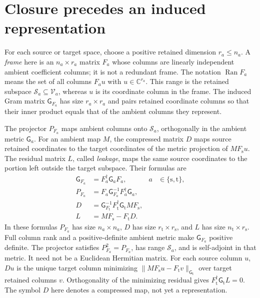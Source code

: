\section{Closure precedes an induced representation}

\begin{definition}
\label{def:symmetry-retained-frame}
For each source or target space, choose a positive retained dimension
$r_a\leq n_a$. A \emph{frame} here is an $n_a\times r_a$ matrix $F_a$ whose
columns are linearly independent ambient coefficient columns; it is not a
redundant frame. The notation $\operatorname{Ran}F_a$ means the set of all
columns $F_a u$ with $u\in\mathbb C^{r_a}$. This range is the retained
subspace $\mathcal S_a\subseteq\mathcal V_a$, whereas $u$ is its coordinate
column in the frame. The induced Gram matrix $\mathsf G_{F_a}$ has size
$r_a\times r_a$ and pairs retained coordinate columns so that their inner
product equals that of the ambient columns they represent.
\end{definition}

\begin{definition}
\label{def:symmetry-compression-leakage}
The projector $P_{F_a}$ maps ambient columns onto $\mathcal S_a$, orthogonally
in the ambient metric $\mathsf G_a$. For an ambient map $M$, the compressed
matrix $D$ maps source retained coordinates to the target coordinates of the
metric projection of $MF_{\mathrm s}u$. The residual matrix $L$, called
\emph{leakage}, maps the same source coordinates to the portion left outside
the target subspace. Their formulas are
\begin{align}
  \mathsf G_{F_a}&=F_a^{\dagger}\mathsf G_a F_a,
    &a&\in\{\mathrm s,\mathrm t\},
    \label{eq:symmetry-frame-metric}\\
  P_{F_a}&=F_a\mathsf G_{F_a}^{-1}F_a^{\dagger}\mathsf G_a,
    \label{eq:symmetry-frame-projector}\\
  D&=\mathsf G_{F_{\mathrm t}}^{-1}
      F_{\mathrm t}^{\dagger}\mathsf G_{\mathrm t}MF_{\mathrm s},
    \label{eq:symmetry-compressed-action}\\
  L&=MF_{\mathrm s}-F_{\mathrm t}D.
    \label{eq:symmetry-leakage}
\end{align}
In these formulas $P_{F_a}$ has size $n_a\times n_a$, $D$ has size
$r_{\mathrm t}\times r_{\mathrm s}$, and $L$ has size
$n_{\mathrm t}\times r_{\mathrm s}$. Full column rank and a positive-definite
ambient metric make $\mathsf G_{F_a}$ positive definite. The projector
satisfies $P_{F_a}^2=P_{F_a}$, has range $\mathcal S_a$, and is self-adjoint
in that metric. It need not be a Euclidean Hermitian matrix.
For each source column $u$, $Du$ is the unique target column minimizing
$\|MF_{\mathrm s}u-F_{\mathrm t}v\|_{\mathsf G_{\mathrm t}}$ over target
retained columns $v$. Orthogonality of the minimizing residual gives
$F_{\mathrm t}^{\dagger}\mathsf G_{\mathrm t}L=0$.
The symbol $D$ here denotes a compressed map, not yet a representation.
\end{definition}

